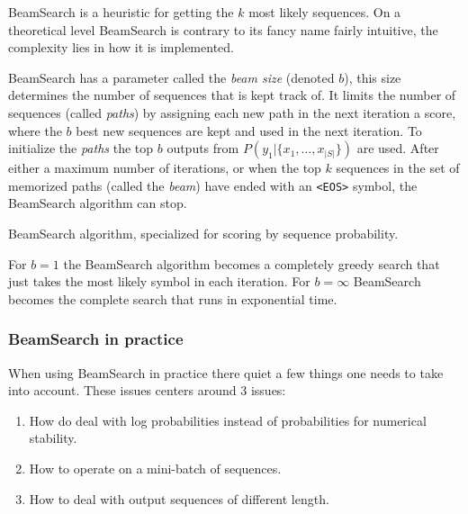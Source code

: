 BeamSearch is a heuristic for getting the $k$ most likely sequences. On a theoretical level BeamSearch is contrary to its fancy name fairly intuitive, the complexity lies in how it is implemented.

BeamSearch has a parameter called the \textit{beam size} (denoted $b$), this size determines the number of sequences that is kept track of. It limits the number of sequences (called \textit{paths}) by assigning each new path in the next iteration a score, where the $b$ best new sequences are kept and used in the next iteration. To initialize the \textit{paths} the top $b$ outputs from $P(y_1| \{x_1, \dots, x_{|S|}\})$ are used. After either a maximum number of iterations, or when the top $k$ sequences in the set of memorized paths (called the \textit{beam}) have ended with an \texttt{<EOS>} symbol, the BeamSearch algorithm can stop.

\begin{algorithm}[H]
  \caption{BeamSearch algorithm, specialized for scoring by sequence probability.}
  \begin{algorithmic}[1]
      \Repeat
        \EndFor
      \State {}
    \EndFunction
  \end{algorithmic}
\end{algorithm}

For $b = 1$ the BeamSearch algorithm becomes a completely greedy search that just takes the most likely symbol in each iteration. For $b = \infty$ BeamSearch becomes the complete search that runs in exponential time.

\subsubsection{BeamSearch in practice}

When using BeamSearch in practice there quiet a few things one needs to take into account. These issues centers around 3 issues:
\begin{enumerate}
\item How do deal with log probabilities instead of probabilities for numerical stability.
\item How to operate on a mini-batch of sequences.
\item How to deal with output sequences of different length.
\end{enumerate}

